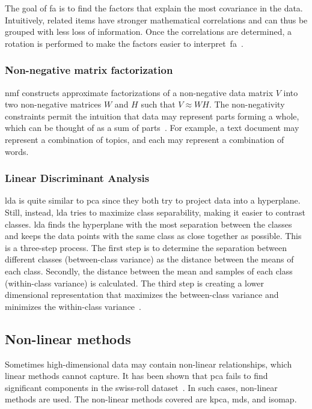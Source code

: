 The goal of \gls{fa} is to find the factors that explain the most covariance in the data. Intuitively, related items have stronger mathematical correlations and can thus be grouped with less loss of information. Once the correlations are determined, a rotation is performed to make the factors easier to interpret~\gls{fa}~\cite{decoster-1998-factor-analysis-overview}.


\subsubsection{Non-negative matrix factorization}\label{subsubsec:non-negative-matrix-factorization}
\gls{nmf} constructs approximate factorizations of a non-negative data matrix $V$ into two non-negative matrices $W$ and $H$ such that $V \approx WH$. The non-negativity constraints permit the intuition that data may represent parts forming a whole, which can be thought of as a sum of parts~\cite{lee-1999-learning-nmf}. For example, a text document may represent a combination of topics, and each may represent a combination of words.


\subsubsection{Linear Discriminant Analysis}\label{subsubsec:linear-discriminant-analysis}

\gls{lda} is quite similar to \gls{pca} since they both try to project data into a hyperplane. Still, instead, \gls{lda} tries to maximize class separability, making it easier to contrast classes. \gls{lda} finds the hyperplane with the most separation between the classes and keeps the data points with the same class as close together as possible. This is a three-step process. The first step is to determine the separation between different classes (between-class variance) as the distance between the means of each class. Secondly, the distance between the mean and samples of each class (within-class variance) is calculated. The third step is creating a lower dimensional representation that maximizes the between-class variance and minimizes the within-class variance~\cite{linear-discriminant-analysis-tutorial}.


\subsection{Non-linear methods}\label{subsec:non-linear-methods}
Sometimes high-dimensional data may contain non-linear relationships, which linear methods cannot capture. It has been shown that \gls{pca} fails to find significant components in the swiss-roll dataset~\cite{tennenbaum}. In such cases, non-linear methods are used. The non-linear methods covered are \gls{kpca}, \gls{mds}, and \gls{isomap}.

